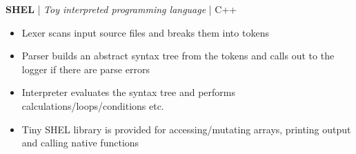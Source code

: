 \textbf{SHEL} | \textit{Toy interpreted programming language} | C++
\begin{itemize}
    \item Lexer scans input source files and breaks them into tokens
    \item Parser builds an abstract syntax tree from the tokens and calls out to the logger if there are parse errors
    \item Interpreter evaluates the syntax tree and performs calculations/loops/conditions etc.
    \item Tiny SHEL library is provided for accessing/mutating arrays, printing output and calling native functions
\end{itemize}
